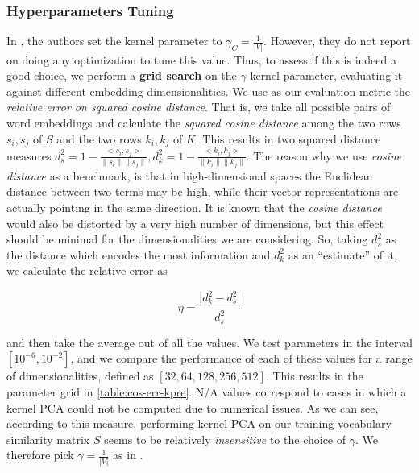 \subsubsection{Hyperparameters Tuning}
In \cite{gupta_improving_2019}, the authors set the kernel parameter to $\gamma_C = \frac{1}{|V|}$. However, they do not report on doing any optimization to tune this value.
Thus, to assess if this is indeed a good choice, we perform a \textbf{grid search} on the $\gamma$ kernel parameter, evaluating it against different embedding dimensionalities.
We use as our evaluation metric the \emph{relative error on squared cosine distance}.
That is, we take all possible pairs of word embeddings and calculate the \emph{squared cosine distance} among the two rows $s_i, s_j$ of $S$ and the two rows $k_i, k_j$ of $K$.
This results in two squared distance measures $d^2_{s} = 1 - \frac{<s_i, s_j>}{\|s_i\|\|s_j\|}, d^2_{k} = 1 - \frac{<k_i, k_j>}{\|k_i\|\|k_j\|}$.
The reason why we use \textit{cosine distance} as a benchmark, is that in high-dimensional spaces the Euclidean distance between two terms may be high, while their vector representations are actually pointing in the same direction. It is known that the \textit{cosine distance} would also be distorted by a very high number of dimensions, but this effect should be minimal for the dimensionalities we are considering.
So, taking $d^2_{s}$ as the distance which encodes the most information and $d^2_k$ as an ``estimate'' of it,  we calculate the relative error as 

\begin{equation}
    \eta = \frac{|d^2_{k} - d^2_{s}|}{d^2_{s}}
\end{equation}

and then take the average out of all the values. We test parameters in the interval $[10^{-6}, 10^{-2}]$, and we compare the performance of each of these values for a range of dimensionalities, defined as $[32,64,128,256,512]$. 
This results in the parameter grid in \cref{table:cos-err-kpre}. 
N/A values correspond to cases in which a kernel PCA could not be computed due to numerical issues.
As we can see, according to this measure, performing kernel PCA on our training vocabulary similarity matrix $S$ seems to be relatively \textit{insensitive} to the choice of $\gamma$.
We therefore pick $\gamma = \frac{1}{|V|}$ as in \cite{gupta_improving_2019}.


